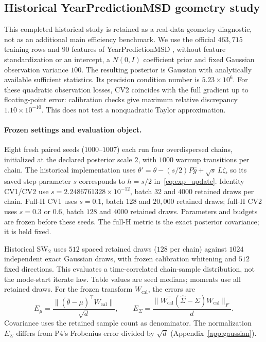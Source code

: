 \subsection{Historical YearPredictionMSD geometry study}\label{app:year_geometry}
This completed historical study is retained as a real-data geometry diagnostic, not as an additional main efficiency benchmark. We use the official $463{,}715$ training rows and $90$ features of YearPredictionMSD \citep{bertin2011year}, without feature standardization or an intercept, a $N(0,I)$ coefficient prior and fixed Gaussian observation variance $100$. The resulting posterior is Gaussian with analytically available sufficient statistics. Its precision condition number is $5.23\times10^6$. For these quadratic observation losses, CV2 coincides with the full gradient up to floating-point error: calibration checks give maximum relative discrepancy $1.10\times10^{-10}$. This does not test a nonquadratic Taylor approximation.

\paragraph{Frozen settings and evaluation object.}
Eight fresh paired seeds ($1000$--$1007$) each run four overdispersed chains, initialized at the declared posterior scale $2$, with $1000$ warmup transitions per chain. The historical implementation uses $\theta'=\theta-(s/2)P\widehat g+\sqrt{s}\,L\zeta$, so its saved step parameter $s$ corresponds to $h=s/2$ in~\eqref{eq:exp_update}. Identity CV1/CV2 use $s=2.2486761328\times10^{-12}$, batch $32$ and $4000$ retained draws per chain. Full-H CV1 uses $s=0.1$, batch $128$ and $20{,}000$ retained draws; full-H CV2 uses $s=0.3$ or $0.6$, batch $128$ and $4000$ retained draws. Parameters and budgets are frozen before these seeds. The full-H metric is the exact posterior covariance; it is held fixed.

Historical SW$_2$ uses $512$ spaced retained draws ($128$ per chain) against $1024$ independent exact Gaussian draws, with frozen calibration whitening and $512$ fixed directions. This evaluates a time-correlated chain-sample distribution, not the mode-start iterate law. Table values are seed medians; moments use all retained draws. For the frozen transform $W_{\mathrm{cal}}$, the errors are
\[
 E_\mu=\frac{\|(\bar\theta-\mu)^\top W_{\mathrm{cal}}\|}{\sqrt d},\qquad
 E_\Sigma=\frac{\|W_{\mathrm{cal}}^\top(\widehat\Sigma-\Sigma)W_{\mathrm{cal}}\|_F}{d}.
\]
Covariance uses the retained sample count as denominator. The normalization $E_\Sigma$ differs from P4's Frobenius error divided by $\sqrt d$ (Appendix~\ref{app:gaussian}).


